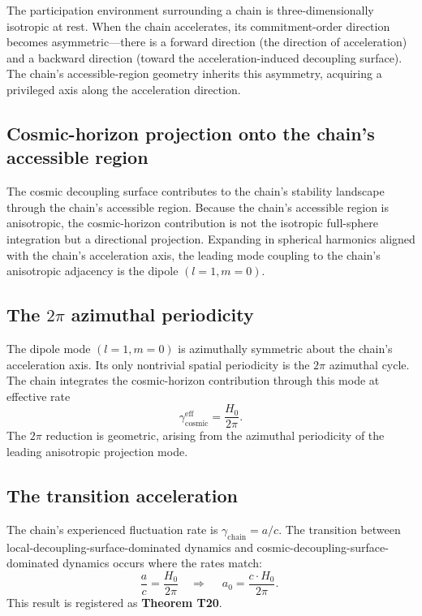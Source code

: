 \documentclass[11pt,a4paper]{article}
\begin{document}
The participation environment surrounding a chain is three-dimensionally isotropic at rest. When the chain accelerates, its commitment-order direction becomes asymmetric---there is a forward direction (the direction of acceleration) and a backward direction (toward the acceleration-induced decoupling surface). The chain's accessible-region geometry inherits this asymmetry, acquiring a privileged axis along the acceleration direction.

\subsection{Cosmic-horizon projection onto the chain's accessible region}

The cosmic decoupling surface contributes to the chain's stability landscape through the chain's accessible region. Because the chain's accessible region is anisotropic, the cosmic-horizon contribution is not the isotropic full-sphere integration but a directional projection. Expanding in spherical harmonics aligned with the chain's acceleration axis, the leading mode coupling to the chain's anisotropic adjacency is the dipole $(l=1, m=0)$.

\subsection{The $2\pi$ azimuthal periodicity}

The dipole mode $(l=1, m=0)$ is azimuthally symmetric about the chain's acceleration axis. Its only nontrivial spatial periodicity is the $2\pi$ azimuthal cycle. The chain integrates the cosmic-horizon contribution through this mode at effective rate
\begin{equation}
\gamma_{\mathrm{cosmic}}^{\mathrm{eff}} = \frac{H_0}{2\pi}.
\end{equation}
The $2\pi$ reduction is geometric, arising from the azimuthal periodicity of the leading anisotropic projection mode.

\subsection{The transition acceleration}

The chain's experienced fluctuation rate is $\gamma_{\mathrm{chain}} = a/c$. The transition between local-decoupling-surface-dominated dynamics and cosmic-decoupling-surface-dominated dynamics occurs where the rates match:
\begin{equation}
\frac{a}{c} = \frac{H_0}{2\pi} \quad\Longrightarrow\quad \boxed{\;a_0 = \frac{c \cdot H_0}{2\pi}.\;}
\end{equation}
This result is registered as \textbf{Theorem T20}.
\end{document}
